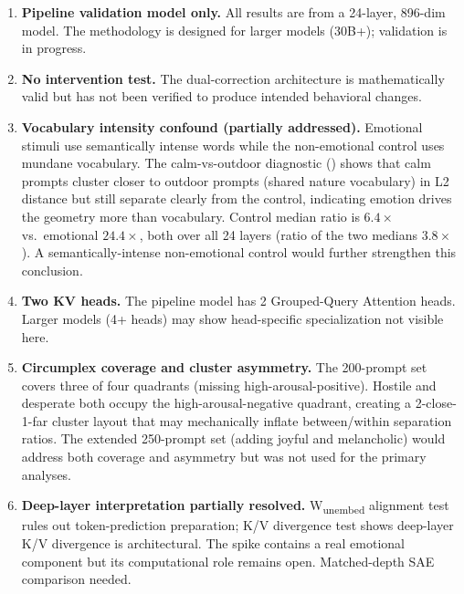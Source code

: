 \documentclass[11pt,a4paper]{article}
\begin{document}
\begin{enumerate}[nosep]
    \item \textbf{Pipeline validation model only.} All results are from a
          24-layer, 896-dim model. The methodology is designed for larger
          models (30B+); validation is in progress.
    \item \textbf{No intervention test.} The dual-correction architecture
          is mathematically valid but has not been verified to produce
          intended behavioral changes.
    \item \textbf{Vocabulary intensity confound (partially addressed).}
          Emotional stimuli use semantically intense words while the
          non-emotional control uses mundane vocabulary. The
          calm-vs-outdoor diagnostic () shows that calm
          prompts cluster closer to outdoor prompts (shared nature
          vocabulary) in L2 distance but still separate clearly from the
          control, indicating emotion drives the geometry more than
          vocabulary. Control median ratio is $6.4\times$
          vs.\ emotional $24.4\times$, both over all 24 layers (ratio of the two medians $3.8\times$). A semantically-intense
          non-emotional control would further strengthen this conclusion.
    \item \textbf{Two KV heads.} The pipeline model has 2 Grouped-Query
          Attention heads. Larger models (4+ heads) may show
          head-specific specialization not visible here.
    \item \textbf{Circumplex coverage and cluster asymmetry.} The
          200-prompt set covers three of four quadrants (missing
          high-arousal-positive). Hostile and desperate both occupy the
          high-arousal-negative quadrant, creating a 2-close-1-far
          cluster layout that may mechanically inflate between/within
          separation ratios. The extended 250-prompt set (adding joyful
          and melancholic) would address both coverage and asymmetry but
          was not used for the primary analyses.
    \item \textbf{Deep-layer interpretation partially resolved.}
          W\textsubscript{unembed} alignment test rules out
          token-prediction preparation; K/V divergence test shows
          deep-layer K/V divergence is architectural. The spike contains
          a real emotional component but its computational role remains
          open. Matched-depth SAE comparison needed.
\end{enumerate}
\end{document}
